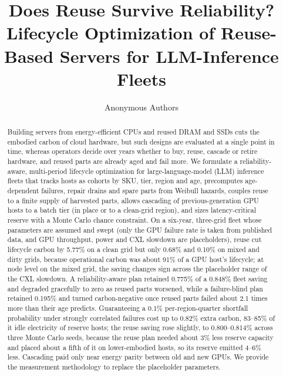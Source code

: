 \documentclass[11pt]{article}
\title{Does Reuse Survive Reliability? Lifecycle Optimization of Reuse-Based Servers for LLM-Inference Fleets}
\author{Anonymous Authors}
\date{}
\begin{document}
\maketitle

\begin{abstract}
Building servers from energy-efficient CPUs and reused DRAM and SSDs cuts the embodied carbon of cloud hardware, but such designs are evaluated at a single point in time, whereas operators decide over years whether to buy, reuse, cascade or retire hardware, and reused parts are already aged and fail more. We formulate a reliability-aware, multi-period lifecycle optimization for large-language-model (LLM) inference fleets that tracks hosts as cohorts by SKU, tier, region and age, precomputes age-dependent failures, repair drains and spare parts from Weibull hazards, couples reuse to a finite supply of harvested parts, allows cascading of previous-generation GPU hosts to a batch tier (in place or to a clean-grid region), and sizes latency-critical reserve with a Monte Carlo chance constraint. On a six-year, three-grid fleet whose parameters are assumed and swept (only the GPU failure rate is taken from published data, and GPU throughput, power and CXL slowdown are placeholders), reuse cut lifecycle carbon by 5.77\% on a clean grid but only 0.68\% and 0.10\% on mixed and dirty grids, because operational carbon was about 91\% of a GPU host's lifecycle; at node level on the mixed grid, the saving changes sign across the placeholder range of the CXL slowdown. A reliability-aware plan retained 0.775\% of a 0.848\% fleet saving and degraded gracefully to zero as reused parts worsened, while a failure-blind plan retained 0.195\% and turned carbon-negative once reused parts failed about 2.1 times more than their age predicts. Guaranteeing a 0.1\% per-region-quarter shortfall probability under strongly correlated failures cost up to 0.82\% extra carbon, 83--85\% of it idle electricity of reserve hosts; the reuse saving rose slightly, to 0.800--0.814\% across three Monte Carlo seeds, because the reuse plan needed about 3\% less reserve capacity and placed about a fifth of it on lower-embodied hosts, so its reserve emitted 4--6\% less. Cascading paid only near energy parity between old and new GPUs. We provide the measurement methodology to replace the placeholder parameters.
\end{abstract}
\end{document}
